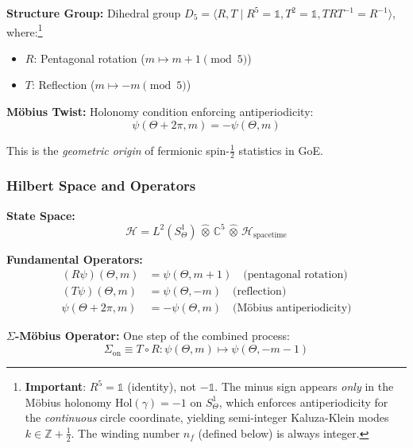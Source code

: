 \documentclass[12pt]{article}
\begin{document}
\textbf{Structure Group:} Dihedral group $D_5 = \langle R, T \mid R^5 = \mathbb{1}, T^2 = \mathbb{1}, TRT^{-1} = R^{-1} \rangle$, where:\footnote{\textbf{Important}: $R^5 = \mathbb{1}$ (identity), not $-\mathbb{1}$. The minus sign appears \emph{only} in the M\"obius holonomy $\text{Hol}(\gamma) = -1$ on $S^1_\Theta$, which enforces antiperiodicity for the \emph{continuous} circle coordinate, yielding semi-integer Kaluza-Klein modes $k \in \mathbb{Z} + \frac{1}{2}$. The winding number $n_f$ (defined below) is always integer.}
\begin{itemize}
\item $R$: Pentagonal rotation ($m \mapsto m+1 \pmod{5}$)
\item $T$: Reflection ($m \mapsto -m \pmod{5}$)
\end{itemize}

\textbf{M\"obius Twist:} Holonomy condition enforcing antiperiodicity:
\begin{equation}
\boxed{\psi(\Theta + 2\pi, m) = -\psi(\Theta, m)}
\end{equation}

This is the \textit{geometric origin} of fermionic spin-$\frac{1}{2}$ statistics in GoE.

\subsubsection{Hilbert Space and Operators}

\textbf{State Space:}
\begin{equation}
\mathcal{H} = L^2(S^1_\Theta) \,\widehat{\otimes}\, \mathbb{C}^5 \,\widehat{\otimes}\, \mathcal{H}_{\text{spacetime}}
\end{equation}

\textbf{Fundamental Operators:}
\begin{align}
(R\psi)(\Theta, m) &= \psi(\Theta, m+1) \quad \text{(pentagonal rotation)} \\
(T\psi)(\Theta, m) &= \psi(\Theta, -m) \quad \text{(reflection)} \\
\psi(\Theta + 2\pi, m) &= -\psi(\Theta, m) \quad \text{(M\"obius antiperiodicity)}
\end{align}

\textbf{$\Sigma$-M\"obius Operator:} One step of the combined process:
\begin{equation}
\boxed{\Sigma_{\text{on}} \equiv T \circ R : \psi(\Theta, m) \mapsto \psi(\Theta, -m-1)}
\end{equation}
\end{document}

